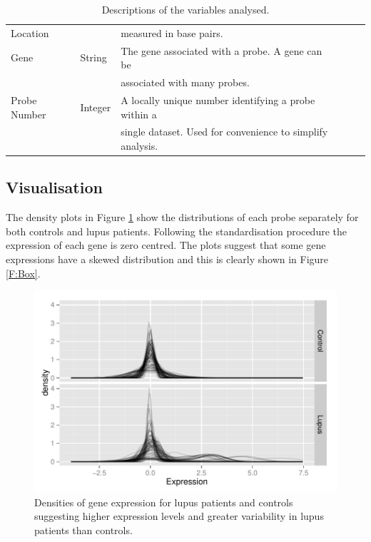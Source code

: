 \documentclass[a4paper, 12pt]{report}
\begin{document}
\begin{table}[ht]
\begin{centering}
\begin{tabular}{llllll}
Location && measured in base pairs. \\
Gene & String &  The gene associated with a probe. A gene can be \\
&& associated with many probes. \\
Probe Number & Integer & A locally unique number identifying a probe within a \\ 
&&single dataset. Used for convenience to simplify analysis.  \\
   \hline
\end{tabular}
\caption{Descriptions of the variables analysed.} 
\label{T:Data}
\end{centering}
\end{table}

\subsection*{Visualisation}
The density plots in Figure \ref{F:Density} show the distributions of each probe separately for both controls and lupus patients. Following the standardisation procedure the expression of each gene is zero centred. The plots suggest that some gene expressions have a skewed distribution and this is clearly shown in Figure \ref{F:Box}.

\begin{figure}[H]
\begin{centering}
\includegraphics[width=\textwidth]{densities.pdf}
\caption{Densities of gene expression for lupus patients and controls suggesting higher expression levels and greater variability in lupus patients than controls.} 
\label{F:Density}
\end{centering}
\end{figure}
\end{document}
